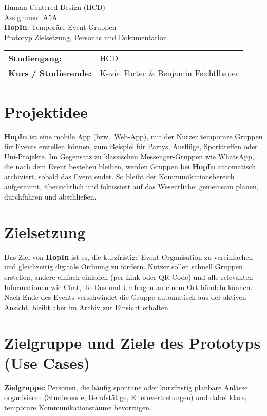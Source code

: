 \documentclass[11pt,a4paper]{article}
\newcommand{\appname}{\textbf{HopIn}}
\begin{document}
\begin{titlepage}
  \centering
  {\Large Human-Centered Design (HCD)}\\[2ex]
  {\large Assignment A5A}\\[10ex]
  {\huge \textbf{HopIn}: Temporäre Event-Gruppen}\\[3ex]
  {\large Prototyp Zielsetzung, Personas und Dokumentation}\\[8ex]

  \begin{tabular}{@{}p{4cm}p{9cm}@{}}
    \textbf{Studiengang:} & HCD \\
    \textbf{Kurs / Studierende:} & Kevin Forter \& Benjamin Feichtlbauer \\
  \end{tabular}

  \vfill
\end{titlepage}

\section*{Projektidee}
\appname{} ist eine mobile App (bzw.\ Web-App), mit der Nutzer temporäre Gruppen für Events erstellen können, zum Beispiel für Partys, Ausflüge, Sporttreffen oder Uni-Projekte.
Im Gegensatz zu klassischen Messenger-Gruppen wie WhatsApp, die nach dem Event bestehen bleiben, werden Gruppen bei \appname{} automatisch archiviert, sobald das Event endet.
So bleibt der Kommunikationsbereich aufgeräumt, übersichtlich und fokussiert auf das Wesentliche: gemeinsam planen, durchführen und abschließen.

\section*{Zielsetzung}
Das Ziel von \appname{} ist es, die kurzfristige Event-Organisation zu vereinfachen und gleichzeitig digitale Ordnung zu fördern.
Nutzer sollen schnell Gruppen erstellen, andere einfach einladen (per Link oder QR-Code) und alle relevanten Informationen wie Chat, To-Dos und Umfragen an einem Ort bündeln können.
Nach Ende des Events verschwindet die Gruppe automatisch aus der aktiven Ansicht, bleibt aber im Archiv zur Einsicht erhalten.

\section*{Zielgruppe und Ziele des Prototyps (Use Cases)}
\textbf{Zielgruppe:} Personen, die häufig spontane oder kurzfristig planbare Anlässe organisieren (Studierende, Berufstätige, Elternvertretungen) und dabei klare, temporäre Kommunikationsräume bevorzugen.
\end{document}
